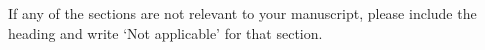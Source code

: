 \documentclass[sn-mathphys,Numbered]{sn-jnl}%
\theoremstyle{thmstyleone}%
\theoremstyle{thmstyletwo}%
\theoremstyle{thmstylethree}%
\begin{document}
\noindent
If any of the sections are not relevant to your manuscript, please include the heading and write `Not applicable' for that section. 




\end{document}

